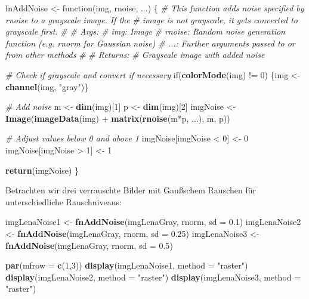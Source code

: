 \documentclass[10pt,]{article}
\newenvironment{Shaded}{\begin{snugshade}}{\end{snugshade}}
\newcommand{\KeywordTok}[1]{\textcolor[rgb]{0.13,0.29,0.53}{\textbf{{#1}}}}
\newcommand{\DataTypeTok}[1]{\textcolor[rgb]{0.13,0.29,0.53}{{#1}}}
\newcommand{\DecValTok}[1]{\textcolor[rgb]{0.00,0.00,0.81}{{#1}}}
\newcommand{\FloatTok}[1]{\textcolor[rgb]{0.00,0.00,0.81}{{#1}}}
\newcommand{\StringTok}[1]{\textcolor[rgb]{0.31,0.60,0.02}{{#1}}}
\newcommand{\CommentTok}[1]{\textcolor[rgb]{0.56,0.35,0.01}{\textit{{#1}}}}
\newcommand{\NormalTok}[1]{{#1}}
\begin{document}
\begin{Shaded}
\begin{Highlighting}[]
\NormalTok{fnAddNoise <-}\StringTok{ }\NormalTok{function(img, rnoise, ...) \{}
  \CommentTok{# This function adds noise specified by rnoise to a grayscale image. If the}
  \CommentTok{# image is not grayscale, it gets converted to grayscale first.}
  \CommentTok{# }
  \CommentTok{# Args:}
  \CommentTok{#   img:    Image}
  \CommentTok{#   rnoise: Random noise generation function (e.g. rnorm for Gaussian noise)}
  \CommentTok{#   ...:    Further arguments passed to or from other methods}
  \CommentTok{#   }
  \CommentTok{# Returns:}
  \CommentTok{#   Grayscale image with added noise}
  
  \CommentTok{# Check if grayscale and convert if necessary}
  \NormalTok{if(}\KeywordTok{colorMode}\NormalTok{(img) !=}\StringTok{ }\DecValTok{0}\NormalTok{) \{img <-}\StringTok{ }\KeywordTok{channel}\NormalTok{(img, }\StringTok{"gray"}\NormalTok{)\}}
  
  \CommentTok{# Add noise}
  \NormalTok{m <-}\StringTok{ }\KeywordTok{dim}\NormalTok{(img)[}\DecValTok{1}\NormalTok{]}
  \NormalTok{p <-}\StringTok{ }\KeywordTok{dim}\NormalTok{(img)[}\DecValTok{2}\NormalTok{]}
  \NormalTok{imgNoise <-}\StringTok{ }\KeywordTok{Image}\NormalTok{(}\KeywordTok{imageData}\NormalTok{(img) +}\StringTok{ }\KeywordTok{matrix}\NormalTok{(}\KeywordTok{rnoise}\NormalTok{(m*p, ...), m, p))}
  
  \CommentTok{# Adjust values below 0 and above 1}
  \NormalTok{imgNoise[imgNoise <}\StringTok{ }\DecValTok{0}\NormalTok{] <-}\StringTok{ }\DecValTok{0}
  \NormalTok{imgNoise[imgNoise >}\StringTok{ }\DecValTok{1}\NormalTok{] <-}\StringTok{ }\DecValTok{1}
  
  \KeywordTok{return}\NormalTok{(imgNoise)}
\NormalTok{\}}
\end{Highlighting}
\end{Shaded}

Betrachten wir drei verrauschte Bilder mit Gaußschem Rauschen für
unterschiedliche Rauschniveaus:

\begin{Shaded}
\begin{Highlighting}[]
\NormalTok{imgLenaNoise1 <-}\StringTok{ }\KeywordTok{fnAddNoise}\NormalTok{(imgLenaGray, rnorm, }\DataTypeTok{sd =} \FloatTok{0.1}\NormalTok{)}
\NormalTok{imgLenaNoise2 <-}\StringTok{ }\KeywordTok{fnAddNoise}\NormalTok{(imgLenaGray, rnorm, }\DataTypeTok{sd =} \FloatTok{0.25}\NormalTok{)}
\NormalTok{imgLenaNoise3 <-}\StringTok{ }\KeywordTok{fnAddNoise}\NormalTok{(imgLenaGray, rnorm, }\DataTypeTok{sd =} \FloatTok{0.5}\NormalTok{)}

\KeywordTok{par}\NormalTok{(}\DataTypeTok{mfrow =} \KeywordTok{c}\NormalTok{(}\DecValTok{1}\NormalTok{,}\DecValTok{3}\NormalTok{))}
\KeywordTok{display}\NormalTok{(imgLenaNoise1, }\DataTypeTok{method =} \StringTok{"raster"}\NormalTok{)}
\KeywordTok{display}\NormalTok{(imgLenaNoise2, }\DataTypeTok{method =} \StringTok{"raster"}\NormalTok{)}
\KeywordTok{display}\NormalTok{(imgLenaNoise3, }\DataTypeTok{method =} \StringTok{"raster"}\NormalTok{)}
\end{Highlighting}
\end{Shaded}
\end{document}
